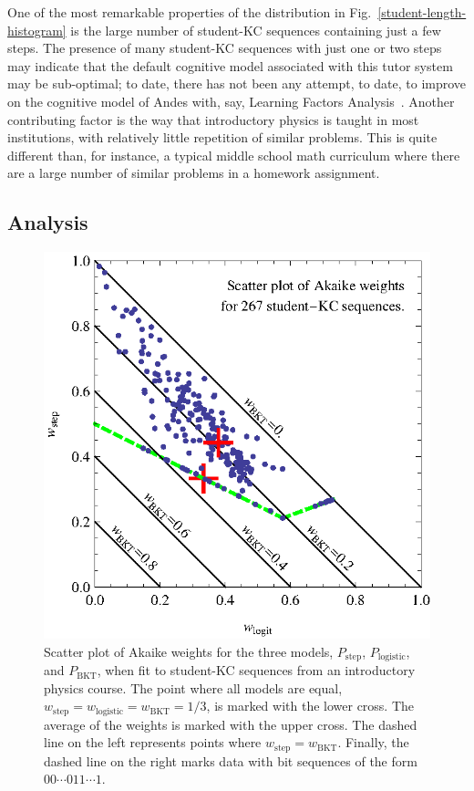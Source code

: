 \documentclass{edm_template}
\begin{document}
One of the most remarkable properties of the distribution in
Fig.~\ref{student-length-histogram} is the large number of
student-KC sequences containing just a few steps.
The presence of many student-KC sequences with just one or two
steps may indicate that the default cognitive model associated 
with this tutor system may be sub-optimal; to date, there has not 
been any attempt, to date, to improve on the cognitive model of 
Andes with, say, Learning Factors Analysis~\cite{cen_learning_2006}.
Another contributing factor is the way that introductory physics is 
taught in most institutions, with relatively little repetition of 
similar problems.  This is quite different than, for instance, 
a typical middle school math curriculum where there are a large number
of similar problems in a homework assignment.

\subsection{Analysis}

\begin{figure}
  \centering \includegraphics{scatter-weights.eps}
  \caption{Scatter plot of  Akaike weights for the three models, 
   $P_\mathrm{step}$, $P_\mathrm{logistic}$, and $P_\mathrm{BKT}$, 
   when fit to student-KC sequences from an introductory physics course.
   The point where all models are equal,
   $w_\mathrm{step}=w_\mathrm{logistic}=w_\mathrm{BKT}=1/3$, is
   marked with the lower cross.  
   The average of the  weights is marked with
   the upper cross.
  The dashed line on the left represents points
   where $w_\mathrm{step}=w_\mathrm{BKT}$.  Finally, the dashed line on 
   the right marks data with bit sequences of the form
   $00\cdots 011\cdots 1$.} 
   \label{scatter1}
\end{figure}
\end{document}
